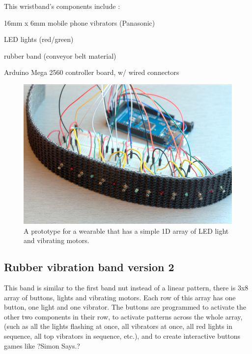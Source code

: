 \documentclass{chi-ext}
\begin{document}
This wristband's components include	:
\begin{inparaenum}
\item 16mm x 6mm mobile phone vibrators (Panasonic)
\item LED lights (red/green)
\item rubber band (conveyor belt material)
\item Arduino Mega 2560 controller board, w/ wired connectors
\end{inparaenum}

\begin{figure}
  \begin{center}
  \includegraphics[width=\columnwidth]{images/P1130394.jpg}
  \caption{A prototype for a wearable that has a simple 1D array of LED light and vibrating motors.}
  \label{fig:marginparsample}
  \end{center}  
\end{figure}


\subsection{Rubber vibration band version 2}
This band is similar to the first band nut instead of a linear pattern, there is 3x8 array of buttons, lights and vibrating motors. Each row of this array has one button, one light and one vibrator. The buttons are programmed to activate the other two components in their row, to activate patterns across the whole array, (such as all the lights flashing at once, all vibrators at once, all red lights in sequence, all top vibrators in sequence, etc.), and to create interactive buttons games like ?Simon Says.?
\end{document}
